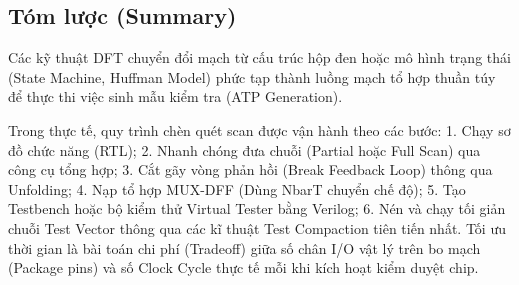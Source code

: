 \subsection{Tóm lược (Summary)}
Các kỹ thuật DFT chuyển đổi mạch từ cấu trúc hộp đen hoặc mô hình trạng thái (State Machine, Huffman Model) phức tạp thành luồng mạch tổ hợp thuần túy để thực thi việc sinh mẫu kiểm tra (ATP Generation). 

Trong thực tế, quy trình chèn quét scan được vận hành theo các bước: 
1. Chạy sơ đồ chức năng (RTL);
2. Nhanh chóng đưa chuỗi (Partial hoặc Full Scan) qua công cụ tổng hợp;
3. Cắt gãy vòng phản hồi (Break Feedback Loop) thông qua Unfolding;
4. Nạp tổ hợp MUX-DFF (Dùng NbarT chuyển chế độ);
5. Tạo Testbench hoặc bộ kiểm thử Virtual Tester bằng Verilog;
6. Nén và chạy tối giản chuỗi Test Vector thông qua các kĩ thuật Test Compaction tiên tiến nhất. Tối ưu thời gian là bài toán chi phí (Tradeoff) giữa số chân I/O vật lý trên bo mạch (Package pins) và số Clock Cycle thực tế mỗi khi kích hoạt kiểm duyệt chip.


